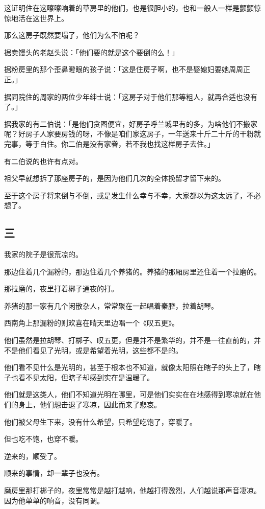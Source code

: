 \documentclass[UTF8]{ctexart}
\begin{document}
这证明住在这嚓嚓响着的草房里的他们，也是很胆小的，也和一般人一样是颤颤惊惊地活在这世界上。

那么这房子既然要塌了，他们为么不怕呢？

据卖馒头的老赵头说：「他们要的就是这个要倒的么！」

据粉房里的那个歪鼻瞪眼的孩子说：「这是住房子啊，也不是娶媳妇要她周周正正。」

据同院住的周家的两位少年绅士说：「这房子对于他们那等粗人，就再合适也没有了。」

据我家的有二伯说：「是他们贪图便宜，好房子呼兰城里有的多，为啥他们不搬家呢？好房子人家要房钱的呀，不像是咱们家这房子，一年送来十斤二十斤的干粉就完事，等于白住。你二伯是没有家眷，若不我也找这样房子去住。」

有二伯说的也许有点对。

祖父早就想拆了那座房子的，是因为他们几次的全体挽留才留下来的。

至于这个房子将来倒与不倒，或是发生什么幸与不幸，大家都以为{这太远了，不必想了}。

\subsection{三}

{我家的院子是很荒凉的。}

那边住着几个漏粉的，那边住着几个养猪的。养猪的那厢房里还住着一个拉磨的。

那拉磨的，夜里打着梆子通夜的打。

养猪的那一家有几个闲散杂人，常常聚在一起唱着秦腔，拉着胡琴。

西南角上那漏粉的则欢喜在晴天里边唱一个《叹五更》。

他们虽然是拉胡琴、打梆子、叹五更，但是并不是繁华的，并不是一往直前的，并不是他们看见了光明，或是希望着光明，这些都不是的。

他们看不见什么是光明的，甚至于根本也不知道，就像太阳照在瞎子的头上了，瞎子也看不见太阳，但瞎子却感到实在是温暖了。

他们就是这类人，他们不知道光明在哪里，可是他们实实在在地感得到寒凉就在他们的身上，他们想击退了寒凉，因此而来了悲哀。

他们被父母生下来，没有什么希望，只希望吃饱了，穿暖了。

但也吃不饱，也穿不暖。

逆来的，顺受了。

顺来的事情，却一辈子也没有。

磨房里那打梆子的，夜里常常是越打越响，他越打得激烈，人们越说那声音凄凉。因为他单单的响音，没有同调。
\end{document}

